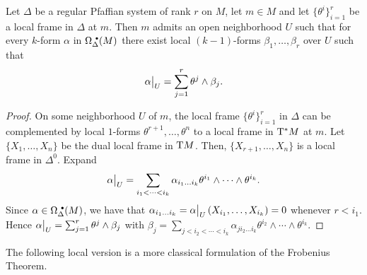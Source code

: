 \begin{lem}[{{\cite[Lem.~4.7.9]{RS1}}}]\label{lem 4.7.9 RS1}
    Let $\Delta$ be a regular Pfaffian system of rank $r$ on $M$, let $m\in M$ and let $\{\theta^i\}_{i=1}^r$ be a local frame in $\Delta$ at $m$. Then $m$ admits an open neighborhood $U$ such that for every $k$-form $\alpha$ in $\Omega^{\smbullet }_\Delta(M)$ there exist local $(k-1)$-forms $\beta_1,\ldots,\beta_r$ over $U$ such that
    \[\restr{\alpha}{U}=\sum_{j=1}^{r}\theta^j\wedge \beta_j.\]
\end{lem}
\begin{proof}
    On some neighborhood $U$ of $m$, the local frame $\{\theta^i\}_{i=1}^r$ in $\Delta$ can be complemented by local $1$-forms $\theta^{r+1}, \ldots,\theta^n$ to a local frame in $\mathrm{T}^\ast M$ at $m$. Let $\{X_1,\ldots,X_n\}$ be the dual local frame in $\mathrm{T} M$. Then, $\{X_{r+1},\ldots,X_n\}$ is a local frame in $\Delta^0$. Expand
    \[\restr{\alpha}{U}=\sum_{i_1<\cdots<i_k} \alpha_{i_1\ldots i_k}\theta^{i_1}\wedge\cdots\wedge \theta^{i_k}.\]
    Since $\alpha\in\Omega^{\smbullet }_\Delta(M)$, we have that $\alpha_{i_1\ldots i_k}=\restr{\alpha}{U}(X_{i_1},\ldots,X_{i_k})=0$ whenever $r<i_1$. Hence $\restr{\alpha}{U}=\sum_{j=1}^r \theta^j\wedge\beta_j$ with $\beta_j=\sum_{j<i_2<\cdots<i_k} \alpha_{ji_2\ldots i_k}\theta^{i_2}\wedge\cdots\wedge \theta^{i_k}$.
\end{proof}

The following local version is a more classical formulation of the Frobenius Theorem.

